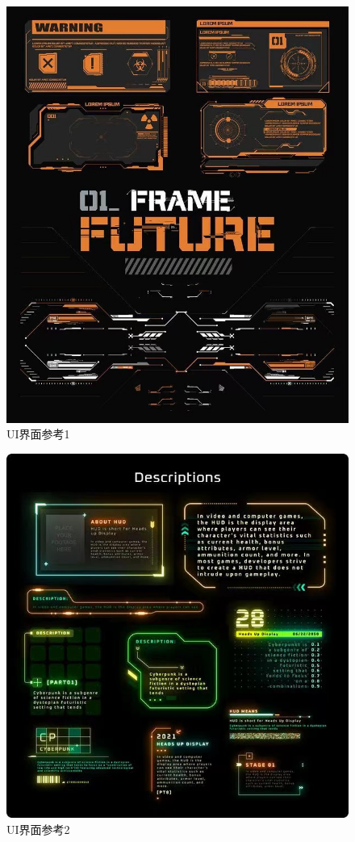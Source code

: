 \documentclass{ctexart}
\begin{document}
			\begin{figure}[H]
				\centering
				\includegraphics[scale=0.5]{material/UI设计参考2.jpeg}
				\caption{UI界面参考1}
			\end{figure}
			\begin{figure}[H]
				\centering
				\includegraphics[scale=0.4]{material/UI设计参考3.jpeg}
				\caption{UI界面参考2}
			\end{figure}
\end{document}

